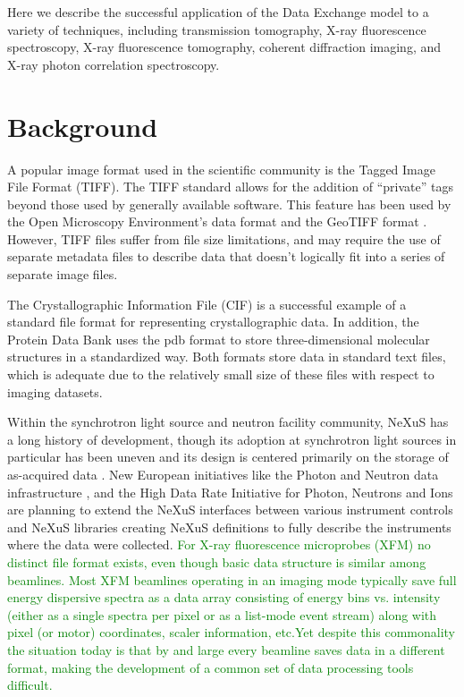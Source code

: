 \documentclass[pdf]{iucr}              %
\begin{document}
Here we describe the successful application of the Data Exchange model to a variety of techniques, including transmission tomography, X-ray fluorescence spectroscopy, X-ray fluorescence tomography, coherent diffraction imaging, and X-ray photon correlation spectroscopy.

\section{Background}

A popular image format used in the scientific community is the Tagged Image File Format (TIFF). The TIFF standard allows for the addition of ``private'' tags beyond those used by generally available software. This feature has been used by the Open Microscopy Environment's data format \cite{OME-TIFF} and the GeoTIFF format \cite{GeoTIFF}. However, TIFF files suffer from file size limitations, and may require the use of separate metadata files to describe data that doesn't logically fit into a series of separate image files.

The Crystallographic Information File (CIF) is a successful example of a standard file format for representing crystallographic data. In addition, the Protein Data Bank uses the pdb format \cite{pdb} to store three-dimensional molecular structures in a standardized way. Both formats store data in standard text files, which is adequate due to the relatively small size of these files with respect to imaging datasets.

Within the synchrotron light source and neutron facility community, NeXuS \cite{Tischler1984} has a long history of development, though its adoption at synchrotron light sources in particular has been uneven and its design is centered primarily on the storage of as-acquired data \cite{NeXuS}. New European initiatives like the Photon and Neutron data infrastructure \cite{PanData_2013}, and the High Data Rate Initiative for Photon, Neutrons and Ions \cite{PNI_HDRI_2013} are
planning to extend the NeXuS interfaces between various instrument controls and NeXuS libraries creating NeXuS definitions to fully describe the instruments where the data were collected. 
\textcolor{green}{For X-ray fluorescence microprobes (XFM) no distinct file format exists, even though basic data structure is similar among beamlines. Most XFM beamlines operating in an imaging mode typically save full energy dispersive spectra as a data array consisting of energy bins vs. intensity (either as a single spectra per pixel or as a list-mode event stream) along with pixel (or motor) coordinates, scaler information, etc.Yet despite this commonality the situation today is that by and large every beamline saves data in a different format, making the development of a common set of data processing tools difficult.} 
\end{document}
